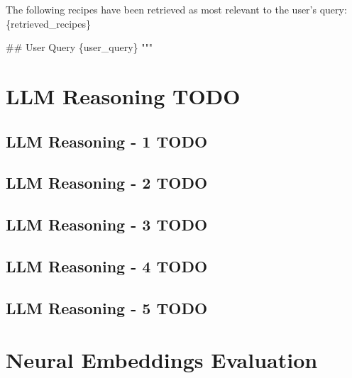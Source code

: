 \documentclass[a4paper,11pt]{article}
\begin{document}
The following recipes have been retrieved as most relevant to the user's query:
\{retrieved\_recipes\}   

\#\# User Query
\{user\_query\}
"""



\section{LLM Reasoning TODO}

\subsection{LLM Reasoning - 1 TODO}

\subsection{LLM Reasoning - 2 TODO}

\subsection{LLM Reasoning - 3 TODO}

\subsection{LLM Reasoning - 4 TODO}

\subsection{LLM Reasoning - 5 TODO}



\section{Neural Embeddings Evaluation}
\end{document}

